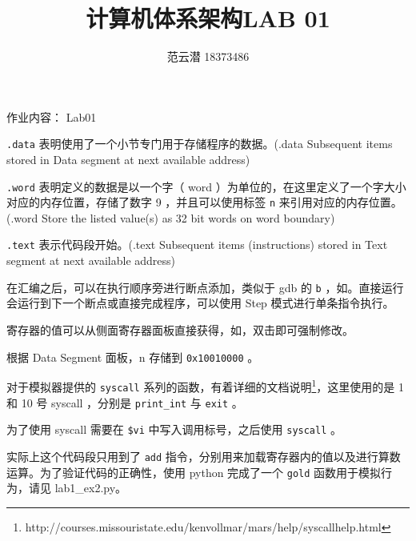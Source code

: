 \documentclass[lang=cn,11pt,a4paper,cite=authoryear]{elegantpaper}
\title{计算机体系架构\quad LAB 01}
\author{范云潜 18373486}
\institute{微电子学院 184111 班}
\date{\zhtoday}
\begin{document}
\maketitle

作业内容： Lab01

\tableofcontents






\lstinline{.data} 表明使用了一个小节专门用于存储程序的数据。(.data       Subsequent items stored in Data segment at next available address)

\lstinline{.word} 表明定义的数据是以一个字（ word ）为单位的，在这里定义了一个字大小对应的内存位置，存储了数字 9 ，并且可以使用标签 \lstinline{n} 来引用对应的内存位置。(.word       Store the listed value(s) as 32 bit words on word boundary)

\lstinline{.text} 表示代码段开始。(.text       Subsequent items (instructions) stored in Text segment at next available address)


在汇编之后，可以在执行顺序旁进行断点添加，类似于 gdb 的 \lstinline{b} ，如。直接运行会运行到下一个断点或直接完成程序，可以使用 Step 模式进行单条指令执行。



寄存器的值可以从侧面寄存器面板直接获得，如，双击即可强制修改。




根据 Data Segment 面板，n 存储到 \lstinline{0x10010000} 。


对于模拟器提供的 \lstinline{syscall} 系列的函数，有着详细的文档说明\footnote{http://courses.missouristate.edu/kenvollmar/mars/help/syscallhelp.html}，这里使用的是 1 和 10 号 syscall ，分别是 \lstinline{print_int} 与 \lstinline{exit} 。

为了使用 syscall 需要在 \lstinline{$vi} 中写入调用标号，之后使用 \lstinline{syscall} 。


实际上这个代码段只用到了 \lstinline{add} 指令，分别用来加载寄存器内的值以及进行算数运算。为了验证代码的正确性，使用 python 完成了一个 \lstinline{gold} 函数用于模拟行为，请见 lab1\_ex2.py。
\end{document}
